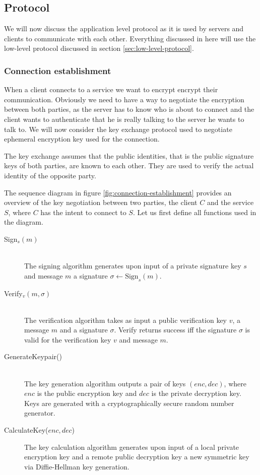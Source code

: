 \subsection{Protocol}
\label{sec:protocol}

We will now discuss the application level protocol as it is used by servers and clients to communicate with each other.
Everything discussed in here will use the low-level protocol discussed in section \ref{sec:low-level-protocol}.

\subsubsection{Connection establishment}
\label{sec:connection-establishment}

When a client connects to a service we want to encrypt encrypt their communication.
Obviously we need to have a way to negotiate the encryption between both parties, as the server has to know who is about to connect and the client wants to authenticate that he is really talking to the server he wants to talk to.
We will now consider the key exchange protocol used to negotiate ephemeral encryption key used for the connection.

The key exchange assumes that the public identities, that is the public signature keys of both parties, are known to each other.
They are used to verify the actual identity of the opposite party.

The sequence diagram in figure \ref{fig:connection-establishment} provides an overview of the key negotiation between two parties, the client $C$ and the service $S$, where $C$ has the intent to connect to $S$.
Let us first define all functions used in the diagram.

\begin{description}
    \item[Sign$_s(m)$]\hfill\\
        The signing algorithm generates upon input of a private signature key $s$ and message $m$ a signature $\sigma \leftarrow \text{Sign}_{s}(m)$.
    \item[Verify$_v(m, \sigma)$]\hfill\\
        The verification algorithm takes as input a public verification key $v$, a message $m$ and a signature $\sigma$.
        Verify returns success iff the signature $\sigma$ is valid for the verification key $v$ and message $m$.
    \item[GenerateKeypair()]\hfill\\
        The key generation algorithm outputs a pair of keys $(enc, dec)$, where $enc$ is the public encryption key and $dec$ is the private decryption key.
        Keys are generated with a cryptographically secure random number generator.
    \item[CalculateKey($enc, dec$)]
        The key calculation algorithm generates upon input of a local private encryption key and a remote public decryption key a new symmetric key via Diffie-Hellman key generation.
\end{description}

